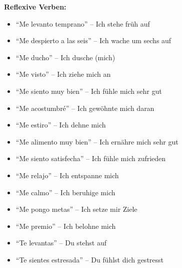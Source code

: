 \documentclass[12pt,a4paper]{article}
\begin{document}
\textbf{Reflexive Verben:}
\begin{itemize}[leftmargin=*]
    \item \enquote{Me levanto temprano} -- Ich stehe früh auf
    \item \enquote{Me despierto a las seis} -- Ich wache um sechs auf
    \item \enquote{Me ducho} -- Ich dusche (mich)
    \item \enquote{Me visto} -- Ich ziehe mich an
    \item \enquote{Me siento muy bien} -- Ich fühle mich sehr gut
    \item \enquote{Me acostumbré} -- Ich gewöhnte mich daran
    \item \enquote{Me estiro} -- Ich dehne mich
    \item \enquote{Me alimento muy bien} -- Ich ernähre mich sehr gut
    \item \enquote{Me siento satisfecha} -- Ich fühle mich zufrieden
    \item \enquote{Me relajo} -- Ich entspanne mich
    \item \enquote{Me calmo} -- Ich beruhige mich
    \item \enquote{Me pongo metas} -- Ich setze mir Ziele
    \item \enquote{Me premio} -- Ich belohne mich
    \item \enquote{Te levantas} -- Du stehst auf
    \item \enquote{Te sientes estresada} -- Du fühlst dich gestresst
\end{itemize}
\end{document}
